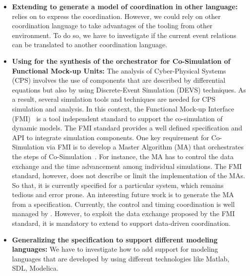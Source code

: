 \begin{itemize}
	\item \textbf{Extending \bcool to generate a model of coordination in other language:} \bcool relies on \ccsl to express the coordination. However, we could rely on other coordination language to take advantages of the tooling from other environment. To do so, we have to investigate if the current event relations can be translated to another coordination language.
	
	\item \textbf{Using \bcool for the synthesis of the orchestrator for Co-Simulation of Functional Mock-up Units:} The analysis of Cyber-Physical Systems (CPS) involves the use of components that are described by differential equations but also by using Discrete-Event Simulation (DEVS) techniques. As a result, several simulation tools and techniques are needed for CPS simulation and analysis. In this context, the Functional Mock-up Interface (FMI)~\cite{fmibib2} is a tool independent standard to support the co-simulation of dynamic models. The FMI standard provides a well defined specification and API to integrate simulation components. One key requirement for Co-Simulation via FMI is to develop a Master Algorithm (MA) that orchestrates the steps of Co-Simulation~\cite{fmibib}. For instance, the MA has to control the data exchange and the time advancement among individual simulations. The FMI standard, however, does not describe or limit the implementation of the MAs. So that, it is currently specified for a particular system, which remains tedious and error prone. An interesting future work is to generate the MA from a \bcool specification. Currently, the control and timing coordination is well managed by \bcool. However, to exploit the data exchange proposed by the FMI standard, it is mandatory to extend \bcool to support data-driven coordination. 
	
	\item \textbf{Generalizing the \bcool specification to support different modeling languages:} We have to investigate how to add support for modeling languages that are developed by using different technologies like Matlab, SDL, Modelica. 
	
		
				
		
		
		
		
\end{itemize}

